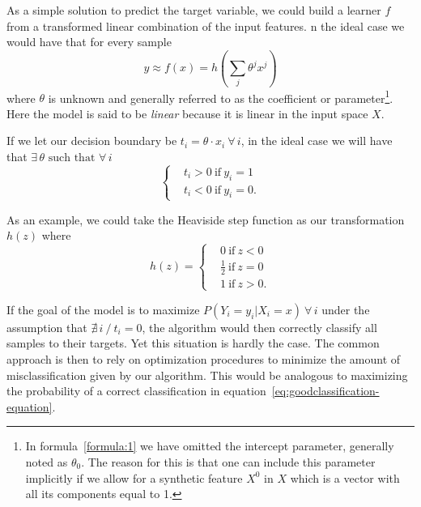 As a simple solution to predict the target variable, we could build a learner $f$ from a transformed linear combination of the input features.
n the ideal case we would have that for every sample
\begin{equation}
y \approx f(x) = h\left(\sum_{j}\theta^j x^j\right)
\label{formula:1}
\end{equation}
where $\theta$ is unknown and generally referred to as the coefficient or parameter\footnote{In formula~\cref{formula:1} we have omitted the intercept parameter, generally noted as $\theta_0$.
The reason for this is that one can include this parameter implicitly if we allow for a synthetic feature $X^0$ in $X$ which is a vector with all its components equal to 1.}.
Here the model is said to be \textit{linear} because it is linear in the input space $X$.

If we let our decision boundary be $ t_i = \theta \cdot x_i \ \forall \, i $, in the ideal case we will have that $\exists \, \theta \mbox{ such that } \forall \, i $
\begin{equation}
\begin{cases}
& t_i >0 \ \mbox{if} \ y_i=1 \\
& t_i <0 \ \mbox{if} \ y_i=0.
\end{cases}
\end{equation}

As an example, we could take the Heaviside step function as our transformation $h(z)$ where
\begin{equation}
h(z) =
\begin{cases}
&0 \ \mbox{if} \ z<0 \\
&\frac{1}{2} \ \mbox{if} \ z=0 \\
&1 \ \mbox{if} \ z>0.
\end{cases}
\end{equation}

If the goal of the model is to maximize $P(Y_i = y_i | X_i = x) \ \forall \, i$
under the assumption that $\nexists\, i \ / \ t_i = 0$, the algorithm would then correctly classify all samples to their targets.
Yet this situation is hardly the case.
The common approach is then to rely on optimization procedures to minimize the amount of misclassification given by our algorithm.
This would be analogous to maximizing the probability of a correct classification in equation~\eqref{eq:goodclassification-equation}.


